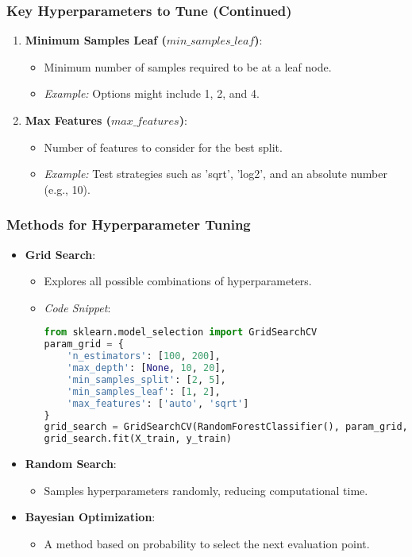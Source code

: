 \documentclass[aspectratio=169]{beamer}
\begin{document}
\begin{frame}
    \frametitle{Key Hyperparameters to Tune (Continued)}
    \begin{enumerate}[resume]
        \item \textbf{Minimum Samples Leaf ($min\_samples\_leaf$)}:
            \begin{itemize}
                \item Minimum number of samples required to be at a leaf node.
                \item \textit{Example:} Options might include 1, 2, and 4.
            \end{itemize}
        \item \textbf{Max Features ($max\_features$)}:
            \begin{itemize}
                \item Number of features to consider for the best split.
                \item \textit{Example:} Test strategies such as 'sqrt', 'log2', and an absolute number (e.g., 10).
            \end{itemize}
    \end{enumerate}
\end{frame}

\begin{frame}[fragile]
    \frametitle{Methods for Hyperparameter Tuning}
    \begin{itemize}
        \item \textbf{Grid Search}:
        \begin{itemize}
            \item Explores all possible combinations of hyperparameters.
            \item \textit{Code Snippet}:
            \begin{lstlisting}[language=Python]
from sklearn.model_selection import GridSearchCV
param_grid = {
    'n_estimators': [100, 200],
    'max_depth': [None, 10, 20],
    'min_samples_split': [2, 5],
    'min_samples_leaf': [1, 2],
    'max_features': ['auto', 'sqrt']
}
grid_search = GridSearchCV(RandomForestClassifier(), param_grid, cv=3)
grid_search.fit(X_train, y_train)
            \end{lstlisting}
        \end{itemize}
        
        \item \textbf{Random Search}:
            \begin{itemize}
                \item Samples hyperparameters randomly, reducing computational time.
            \end{itemize}

        \item \textbf{Bayesian Optimization}:
            \begin{itemize}
                \item A method based on probability to select the next evaluation point.
            \end{itemize}
    \end{itemize}
\end{frame}
\end{document}
